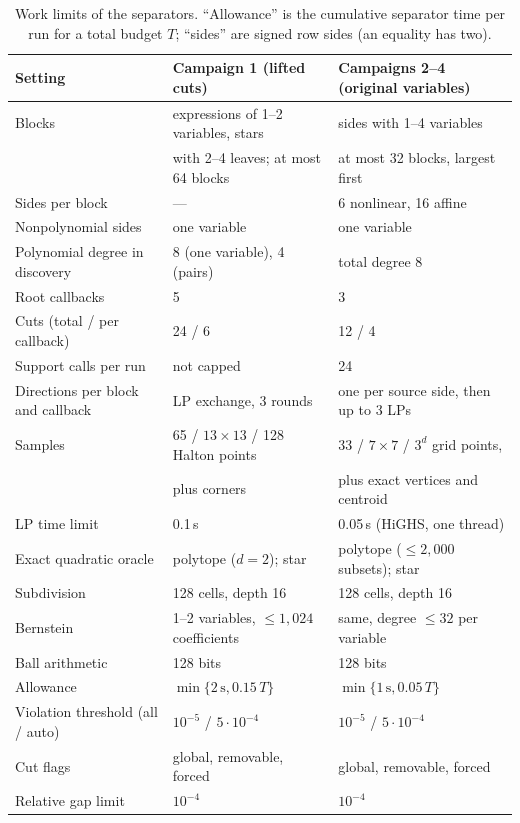 \begin{table}[ht]
\centering\footnotesize
\caption{Work limits of the separators. ``Allowance'' is the cumulative
separator time per run for a total budget $T$; ``sides'' are signed row sides
(an equality has two).}\label{tab:limits}
\begin{tabular}{@{}lll@{}}
\toprule
Setting & Campaign 1 (lifted cuts) & Campaigns 2--4 (original variables)\\
\midrule
Blocks & expressions of 1--2 variables, stars & sides with 1--4 variables\\
       & with 2--4 leaves; at most 64 blocks & at most 32 blocks, largest first\\
Sides per block & --- & 6 nonlinear, 16 affine\\
Nonpolynomial sides & one variable & one variable\\
Polynomial degree in discovery & 8 (one variable), 4 (pairs) & total degree 8\\
Root callbacks & 5 & 3\\
Cuts (total / per callback) & 24 / 6 & 12 / 4\\
Support calls per run & not capped & 24\\
Directions per block and callback & LP exchange, 3 rounds & one per source side, then up to 3 LPs\\
Samples & 65 / $13\times13$ / 128 Halton points & 33 / $7\times7$ / $3^d$ grid points,\\
        & plus corners & plus exact vertices and centroid\\
LP time limit & 0.1\,s & 0.05\,s (HiGHS, one thread)\\
Exact quadratic oracle & polytope ($d=2$); star & polytope ($\le2{,}000$ subsets); star\\
Subdivision & 128 cells, depth 16 & 128 cells, depth 16\\
Bernstein & 1--2 variables, $\le1{,}024$ coefficients & same, degree $\le32$ per variable\\
Ball arithmetic & 128 bits & 128 bits\\
Allowance & $\min\{2\,\mathrm s,0.15\,T\}$ & $\min\{1\,\mathrm s,0.05\,T\}$\\
Violation threshold (all / auto) & $10^{-5}$ / $5\cdot10^{-4}$ & $10^{-5}$ / $5\cdot10^{-4}$\\
Cut flags & global, removable, forced & global, removable, forced\\
Relative gap limit & $10^{-4}$ & $10^{-4}$\\
\bottomrule
\end{tabular}
\end{table}

